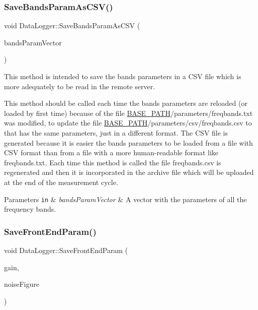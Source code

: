 \subsubsection{\texorpdfstring{Save\+Bands\+Param\+As\+C\+S\+V()}{SaveBandsParamAsCSV()}}
{\footnotesize\ttfamily void Data\+Logger\+::\+Save\+Bands\+Param\+As\+C\+SV (\begin{DoxyParamCaption}\item[{const std\+::vector$<$ \hyperlink{structBandParameters}{Band\+Parameters} $>$ \&}]{bands\+Param\+Vector }\end{DoxyParamCaption})}



This method is intended to save the bands parameters in a C\+SV file which is more adequately to be read in the remote server. 

This method should be called each time the bands\textquotesingle{} parameters are reloaded (or loaded by first time) because of the file \hyperlink{Basics_8h_a0423f4cb393331ce0b9f6b3a43adcaae}{B\+A\+S\+E\+\_\+\+P\+A\+TH}/parameters/freqbands.txt was modified, to update the file \hyperlink{Basics_8h_a0423f4cb393331ce0b9f6b3a43adcaae}{B\+A\+S\+E\+\_\+\+P\+A\+TH}/parameters/csv/freqbands.csv to that has the same parameters, just in a different format. The C\+SV file is generated because it is easier the bands\textquotesingle{} parameters to be loaded from a file with C\+SV format than from a file with a more human-\/readable format like freqbands.\+txt. Each time this method is called the file freqbands.\+csv is regenerated and then it is incorporated in the archive file which will be uploaded at the end of the measurement cycle. 
\begin{DoxyParams}[1]{Parameters}
\mbox{\tt in}  & {\em bands\+Param\+Vector} & A vector with the parameters of all the frequency bands. \\
\hline
\end{DoxyParams}
\mbox{\label{classDataLogger_a058ed66d04269e7d37501ecfe775c067}} 
\subsubsection{\texorpdfstring{Save\+Front\+End\+Param()}{SaveFrontEndParam()}}
{\footnotesize\ttfamily void Data\+Logger\+::\+Save\+Front\+End\+Param (\begin{DoxyParamCaption}\item[{const \hyperlink{structFreqValues}{Freq\+Values} \&}]{gain,  }\item[{const \hyperlink{structFreqValues}{Freq\+Values} \&}]{noise\+Figure }\end{DoxyParamCaption})}




